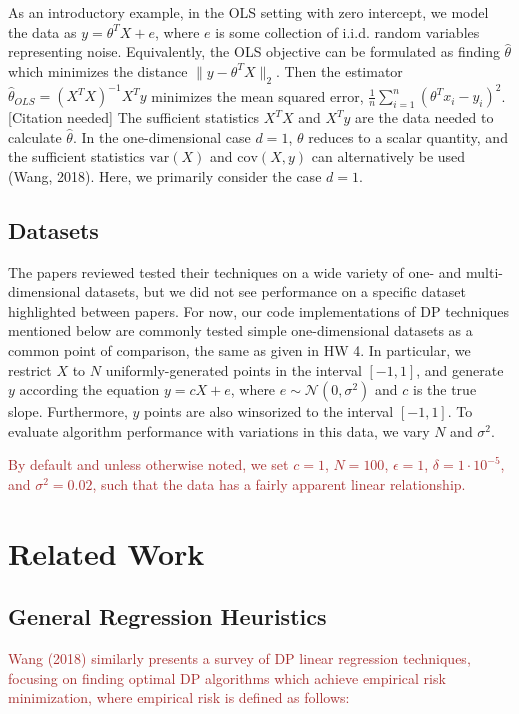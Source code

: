\documentclass[11pt,conference]{IEEEtran}
\newcommand{\Var}{\textrm{var}}
\newcommand{\cov}{\textrm{cov}}
\newcommand{\Normal}{\mathcal{N}}
\begin{document}
As an introductory example, in the OLS setting with zero intercept, we model the data as $y= \theta^T X+e$, where $e$ is some collection of i.i.d. random variables representing noise. Equivalently, the OLS objective can be formulated as finding $\hat{\theta}$ which minimizes the distance $\|y-\theta^T X\|_2$. Then the estimator $\hat{\theta}_{OLS}=(X^T X)^{-1}X^T y$ minimizes the mean squared error, $\frac{1}{n}\sum_{i=1}^n (\theta^T x_i-y_i)^2$. [Citation needed] The sufficient statistics $X^T X$ and $X^T y$ are the data needed to calculate $\hat{\theta}$. In the one-dimensional case $d=1$, $\theta$ reduces to a scalar quantity, and the sufficient statistics $\Var(X)$ and $\cov(X, y)$ can alternatively be used (Wang, 2018). Here, we primarily consider the case $d=1$.

\subsection{Datasets} The papers reviewed tested their techniques on a wide variety of one- and multi-dimensional datasets, but we did not see performance on a specific dataset highlighted between papers. For now, our code implementations of DP techniques mentioned below are commonly tested simple one-dimensional datasets as a common point of comparison, the same as given in HW 4. In particular, we restrict $X$ to $N$ uniformly-generated points in the interval $[-1,1]$, and generate $y$ according the equation $y=cX+e$, where $e\sim \Normal(0,\sigma^2)$ and $c$ is the true slope. Furthermore, $y$ points are also winsorized to the interval $[-1,1]$. To evaluate algorithm performance with variations in this data, we vary $N$ and $\sigma^2$.

\textcolor{brown}{By default and unless otherwise noted, we set $c=1$, $N=100$, $\epsilon=1$, $\delta=1\cdot 10^{-5}$, and $\sigma^2=0.02$, such that the data has a fairly apparent linear relationship.}

\section{Related Work}
\subsection{General Regression Heuristics} \textcolor{brown}{Wang (2018) similarly presents a survey of DP linear regression techniques, focusing on finding optimal DP algorithms which achieve empirical risk minimization, where empirical risk is defined as follows:}
\end{document}
